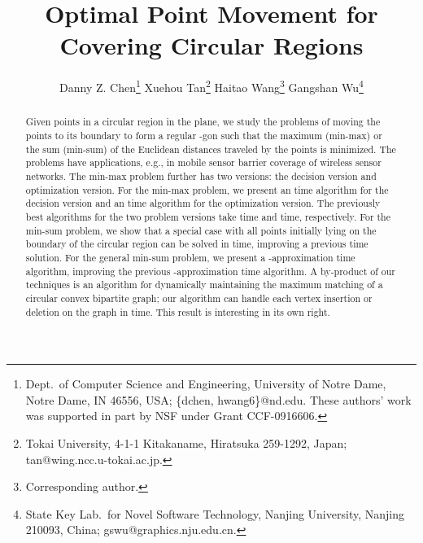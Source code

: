 \documentclass[11pt]{article}
\begin{document}
\baselineskip=14.0pt

\title{
\vspace*{-0.55in}
Optimal Point Movement for Covering Circular Regions
}



\author{
Danny Z. Chen\thanks{Dept.~of Computer Science and Engineering,
University of Notre Dame, Notre Dame, IN 46556, USA; { \{dchen,
hwang6\}@nd.edu.} These authors' work was supported in part by NSF
under Grant CCF-0916606. } \hspace*{0.1in} Xuehou Tan\thanks{Tokai
University, 4-1-1 Kitakaname, Hiratsuka 259-1292, Japan; {
tan@wing.ncc.u-tokai.ac.jp}.} \hspace*{0.1in} Haitao
Wang\footnotemark[1]  \thanks{Corresponding author.} \hspace*{0.1in}
Gangshan Wu\thanks{State Key Lab.~for Novel Software Technology,
Nanjing University, Nanjing 210093, China; {
gswu@graphics.nju.edu.cn}.}}

\date{ }
\maketitle

\pagestyle{plain}
\setcounter{page}{1}


\vspace*{-0.3in}
\begin{abstract}
Given  points in a circular region  in the plane, we study the problems of
moving the  points to its boundary to form a regular -gon such that
the maximum (min-max) or the sum (min-sum) of the Euclidean
distances traveled by the points is minimized. The problems have
applications, e.g., in mobile sensor barrier coverage of wireless
sensor networks.
The min-max problem further has two versions: the decision version and optimization
version. For the min-max problem, we present an  time
algorithm for the decision version and an  time algorithm for
the optimization version. The
previously best algorithms for the two problem versions take  time
and  time, respectively. For the min-sum problem,
we show that a special case with all points initially lying on the
boundary of the circular region can be solved in  time,
improving a previous  time solution. For the general
min-sum problem, we present a -approximation  time
algorithm, improving the previous -approximation  time algorithm.
A by-product of our techniques is an algorithm for dynamically
maintaining the maximum matching of a circular convex bipartite
graph; our algorithm can handle each vertex insertion or deletion on
the graph in  time. This result is interesting in its
own right.
\end{abstract}
\end{document}
